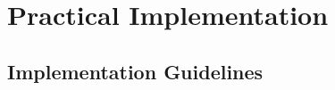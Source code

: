 \documentclass[11pt,oneside]{book}
\theoremstyle{definition}
\theoremstyle{plain}
\theoremstyle{remark}
\begin{document}
\part{Practical Implementation}

\chapter{Implementation Guidelines}







% 
% 
% 
% 
% 

% 
% 
% 
% 
% 



% 
% 
% 
% 
% 

% 
% 
% 
% 
% 

\printbibliography[heading=bibintoc,title={References}]
\end{document}
